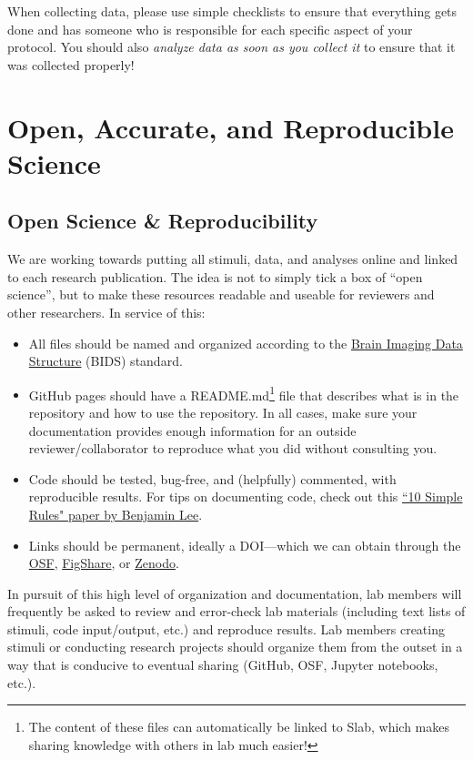 \documentclass[letterpaper,11pt,oneside]{memoir}
\begin{document}
When collecting data, please use simple checklists to ensure that everything gets done and has someone who is responsible for each specific aspect of your protocol. You should also \textit{analyze data as soon as you collect it} to ensure that it was collected properly!


\section{Open, Accurate, and Reproducible Science}
\label{sec:openscience}

\subsection{Open Science \& Reproducibility}

We are working towards putting all stimuli, data, and analyses online and linked to each research publication. The idea is not to simply tick a box of ``open science'', but to make these resources readable and useable for reviewers and other researchers. In service of this:

\begin{itemize}
\item All files should be named and organized according to the \href{https://bids.neuroimaging.io/}{Brain Imaging Data Structure} (BIDS) standard.
\item GitHub pages should have a README.md\footnote{The content of these files can automatically be linked to Slab, which makes sharing knowledge with others in lab much easier!} file that describes what is in the repository and how to use the repository. In all cases, make sure your documentation provides enough information for an outside reviewer/collaborator to reproduce what you did without consulting you.
\item Code should be tested, bug-free, and (helpfully) commented, with reproducible results. For tips on documenting code, check out this \href{https://journals.plos.org/ploscompbiol/article?id=10.1371/journal.pcbi.1006561}{``10 Simple Rules" paper by Benjamin Lee}.
\item Links should be permanent, ideally a DOI---which we can obtain through the \href{http://help.osf.io/m/sharing/l/524208-create-dois-and-arks}{OSF}, \href{https://figshare.com/}{FigShare}, or \href{https://zenodo.org/}{Zenodo}.
\end{itemize}

In pursuit of this high level of organization and documentation, lab members will frequently be asked to review and error-check lab materials (including text lists of stimuli, code input/output, etc.) and reproduce results. Lab members creating stimuli or conducting research projects should organize them from the outset in a way that is conducive to eventual sharing (GitHub, OSF, Jupyter notebooks, etc.).
\end{document}
